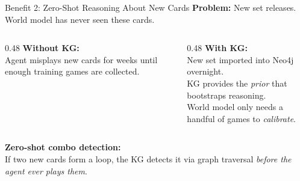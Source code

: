\documentclass[aspectratio=169, 11pt]{beamer}
\begin{document}
\begin{frame}{Benefit 2: Zero-Shot Reasoning About New Cards}
  \textbf{Problem:} New set releases. World model has never seen these cards.
  \vspace{0.4cm}

  \begin{columns}[T]
    \begin{column}{0.48\textwidth}
      \textbf{Without KG:}\\
      Agent misplays new cards for weeks until enough training games
      are collected.
    \end{column}
    \begin{column}{0.48\textwidth}
      \textbf{With KG:}\\
      New set imported into Neo4j overnight.\\
      KG provides the \textit{prior} that bootstraps reasoning.\\
      World model only needs a handful of games to \textit{calibrate}.
    \end{column}
  \end{columns}
  \vspace{0.5cm}

  \begin{center}
    \textbf{Zero-shot combo detection:}\\
    If two new cards form a loop, the KG detects it via
    graph traversal \textit{before the agent ever plays them}.
  \end{center}
\end{frame}
\end{document}
